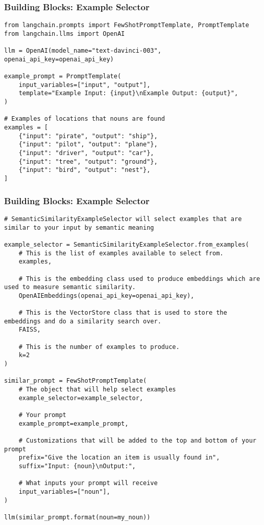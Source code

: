 \begin{frame}[fragile]\frametitle{Building Blocks: Example Selector}

\begin{lstlisting}
from langchain.prompts import FewShotPromptTemplate, PromptTemplate
from langchain.llms import OpenAI

llm = OpenAI(model_name="text-davinci-003", openai_api_key=openai_api_key)

example_prompt = PromptTemplate(
    input_variables=["input", "output"],
    template="Example Input: {input}\nExample Output: {output}",
)

# Examples of locations that nouns are found
examples = [
    {"input": "pirate", "output": "ship"},
    {"input": "pilot", "output": "plane"},
    {"input": "driver", "output": "car"},
    {"input": "tree", "output": "ground"},
    {"input": "bird", "output": "nest"},
]
\end{lstlisting}	  
\end{frame}

\begin{frame}[fragile]\frametitle{Building Blocks: Example Selector}

\begin{lstlisting}
# SemanticSimilarityExampleSelector will select examples that are similar to your input by semantic meaning

example_selector = SemanticSimilarityExampleSelector.from_examples(
    # This is the list of examples available to select from.
    examples, 
    
    # This is the embedding class used to produce embeddings which are used to measure semantic similarity.
    OpenAIEmbeddings(openai_api_key=openai_api_key), 
    
    # This is the VectorStore class that is used to store the embeddings and do a similarity search over.
    FAISS, 
    
    # This is the number of examples to produce.
    k=2
)

similar_prompt = FewShotPromptTemplate(
    # The object that will help select examples
    example_selector=example_selector,
    
    # Your prompt
    example_prompt=example_prompt,
    
    # Customizations that will be added to the top and bottom of your prompt
    prefix="Give the location an item is usually found in",
    suffix="Input: {noun}\nOutput:",
    
    # What inputs your prompt will receive
    input_variables=["noun"],
)

llm(similar_prompt.format(noun=my_noun))
\end{lstlisting}	  
\end{frame}

